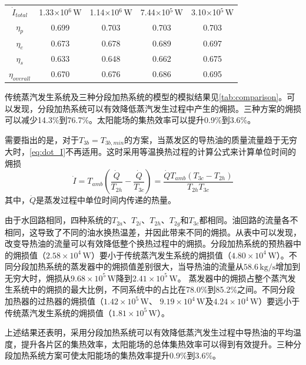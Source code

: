 \begin{table}[t!]
\begin{tabular}{ccccc}
		$\dot{I}_{total}$    &    1.33$\times$10$^6\,\mathrm{W}$    &  1.14$\times$10$^6\,\mathrm{W}$  &	7.44$\times$10$^5\,\mathrm{W}$	&	3.10$\times$10$^5\,\mathrm{W}$\\
		$\eta_p$    &    0.699    &	0.703	&    0.703	&	0.703\\
		$\eta_e$    &    0.673    &	0.678	& 0.689	&	0.697\\
		$\eta_s$    &    0.633    &  0.648	&  0.662	&	0.675\\
		$\eta_{overall}$    &    0.670   &	0.676	&    0.686	&	0.695\\
		\bottomrule
	\end{tabular}
	\label{tab:comparison}
\end{table}

传统蒸汽发生系统及三种分段加热系统的模型的模拟结果见\autoref{tab:comparison}。可以发现，分段加热系统可以有效降低蒸汽发生过程中产生的㶲损。三种方案的㶲损可以减少14.3\%到76.7\%。太阳能场的集热效率可以提升0.9\%到3.6\%。

需要指出的是，对于$T_{3b} = T_{3b,min}$的方案，当蒸发区的导热油的质量流量趋于无穷大时，\autoref{eq:dot_I}不再适用。这时采用等温换热过程的计算公式来计算单位时间的㶲损
\begin{equation}
  \dot{I} = T_{amb} (\frac{\dot{Q}}{T_{2h}} - \frac{\dot{Q}}{T_{3c}}) = \frac{\dot{Q}T_{amb}(T_{3c} - T_{2h})}{T_{2h}T_{3c}}
  \label{eq:isothermal}
\end{equation}
其中，$\dot{Q}$是蒸发过程中单位时间内传递的热量。

由于水回路相同，四种系统的$T_{2a}$、$T_{2i}$、$T_{2h}$、$T_{2g}$和$T_{3c}$都相同。油回路的流量各不相同，这导致了不同的油水换热温差，并因此带来不同的㶲损。从表中可以发现，改变导热油的流量可以有效降低整个换热过程中的㶲损。分段加热系统的预热器中的㶲损值（$2.58\times 10^4\,\mathrm{W}$）要小于传统蒸汽发生系统的㶲损值（$4.80\times10^4\,\mathrm{W}$）。不同分段加热系统的蒸发器中的㶲损值差别很大，当导热油的流量从$58.6\,\mathrm{kg/s}$增加到无穷大时，㶲损从$9.68\times10^5\,\mathrm{W}$降到$2.41\times10^5\,\mathrm{W}$。
蒸发器中的㶲损占整个蒸汽发生系统中的㶲损的最大比例，不同系统中的占比在78.0\%到85.2\%之间。不同分段加热器的过热器的㶲损值（$1.42\times 10^5\,\mathrm{W}$、 $9.19\times 10^4\,\mathrm{W}$及$4.24\times 10^4\,\mathrm{W}$）要远小于传统蒸汽发生系统的㶲损值（$1.81\times10^5\,\mathrm{W}$）。

上述结果还表明，采用分段加热系统可以有效降低蒸汽发生过程中导热油的平均温度，提升各片区的集热效率，太阳能场的总体集热效率可以得到有效提升。三种分段加热系统方案可使太阳能场的集热效率提升0.9\%到3.6\%。


